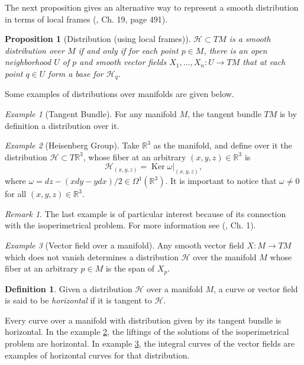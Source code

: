 \documentclass[12pt, letterpaper, reqno]{amsart}
\theoremstyle{definition}
\newtheorem{df}{Definition}
\theoremstyle{plain}
\newtheorem{prop}{Proposition}
\theoremstyle{remark}
\newtheorem{ex}{Example}
\newtheorem{rem}{Remark}
\begin{document}
The next proposition gives an alternative way to represent a smooth distribution in terms of local frames (\cite{lee2003introduction}, Ch. 19, page 491).

\begin{prop} [Distribution (using local frames)]
	$ \mathcal{H}\subset TM $ is a smooth distribution over $M  $ if and only if  for each point $ p\in M $, there is an open neighborhood $ U $ of $ p $  and smooth vector fields $ X_1,\dots,X_n: U \rightarrow {TM} $ that at each point  $ q\in U $ form a base for $ \mathcal{H}_q. $ 
\end{prop}
Some examples of distributions over manifolds are given below.
\begin{ex}[Tangent Bundle]
	For any manifold $ M $, the tangent bundle $ TM $ is by definition a distribution over it. 
\end{ex}
\begin{ex}[Heisenberg Group]\label{ex:heis_group}
	Take $ \mathbb{R} ^3 $ as the manifold, and define over it the distribution $ \mathcal{H}\subset T \mathbb{R} ^3 $, whose fiber at an arbitrary $ (x,y,z)\in \mathbb{R}^3  $ is   
	$$ \mathcal{H}_{(x,y,z)} = \operatorname{Ker} \omega|_{(x,y,z)},$$
	where $ \omega = dz-(x dy-y dx)/2\in\Omega^1( \mathbb{R}^3).$ It is important to notice that $ \omega\neq 0 $ for all $ (x,y,z)\in \mathbb{R}^3. $ 
\end{ex}
\begin{rem}
	The last example is of particular interest because of its connection with the isoperimetrical problem. For more information see (\cite{montgomery2002tour}, Ch. 1).
\end{rem}
\begin{ex}[Vector field over a manifold]\label{ex:vect_field}
Any smooth vector field $ X: M \rightarrow {TM} $ which does not vanish  determines a distribution $ \mathcal{H}$ over the manifold $ M $ whose fiber at an arbitrary $ p\in M $ is the span of $ X_p. $
\end{ex}

\begin{df}\label{def:horizontal_things}
	Given a distribution $ \mathcal{H} $  over a manifold $M$,  a curve or vector field is said to be \textit{horizontal} if it is tangent to $ \mathcal{H} $.
\end{df}

Every curve over a manifold with distribution given by its tangent bundle is horizontal. In the example \ref{ex:heis_group}, the liftings of the solutions of the isoperimetrical problem are horizontal. In example \ref{ex:vect_field}, the integral curves of the vector fields are examples of horizontal curves for that distribution.
\end{document}
